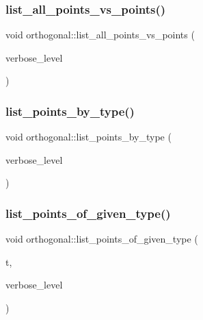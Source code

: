 \subsubsection{\texorpdfstring{list\+\_\+all\+\_\+points\+\_\+vs\+\_\+points()}{list\_all\_points\_vs\_points()}}
{\footnotesize\ttfamily void orthogonal\+::list\+\_\+all\+\_\+points\+\_\+vs\+\_\+points (\begin{DoxyParamCaption}\item[{\mbox{\hyperlink{galois_8h_a09fddde158a3a20bd2dcadb609de11dc}{I\+NT}}}]{verbose\+\_\+level }\end{DoxyParamCaption})}

\mbox{\label{classorthogonal_a078981d509c626c1cdad322ab94c697c}} 
\subsubsection{\texorpdfstring{list\+\_\+points\+\_\+by\+\_\+type()}{list\_points\_by\_type()}}
{\footnotesize\ttfamily void orthogonal\+::list\+\_\+points\+\_\+by\+\_\+type (\begin{DoxyParamCaption}\item[{\mbox{\hyperlink{galois_8h_a09fddde158a3a20bd2dcadb609de11dc}{I\+NT}}}]{verbose\+\_\+level }\end{DoxyParamCaption})}

\mbox{\label{classorthogonal_a80ded28f55a2191d5a5ec5fe9ee1a4c7}} 
\subsubsection{\texorpdfstring{list\+\_\+points\+\_\+of\+\_\+given\+\_\+type()}{list\_points\_of\_given\_type()}}
{\footnotesize\ttfamily void orthogonal\+::list\+\_\+points\+\_\+of\+\_\+given\+\_\+type (\begin{DoxyParamCaption}\item[{\mbox{\hyperlink{galois_8h_a09fddde158a3a20bd2dcadb609de11dc}{I\+NT}}}]{t,  }\item[{\mbox{\hyperlink{galois_8h_a09fddde158a3a20bd2dcadb609de11dc}{I\+NT}}}]{verbose\+\_\+level }\end{DoxyParamCaption})}

